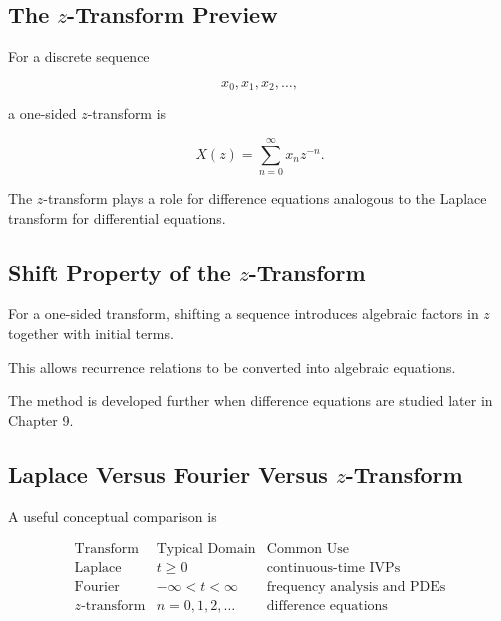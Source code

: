 \subsection{The \(z\)-Transform Preview}
\label{subsec:z-transform-preview}

For a discrete sequence

\[
x_0,x_1,x_2,\ldots,
\]

a one-sided \(z\)-transform is

\[
\boxed{
X(z)
=
\sum_{n=0}^{\infty}
x_nz^{-n}.
}
\]

The \(z\)-transform plays a role for difference equations analogous to
the Laplace transform for differential equations.

\subsection{Shift Property of the \(z\)-Transform}
\label{subsec:z-transform-shift-preview}

For a one-sided transform, shifting a sequence introduces algebraic
factors in \(z\) together with initial terms.

This allows recurrence relations to be converted into algebraic
equations.

The method is developed further when difference equations are studied
later in Chapter 9.

\subsection{Laplace Versus Fourier Versus \(z\)-Transform}
\label{subsec:transform-comparison}

A useful conceptual comparison is

\[
\begin{array}{c|c|c}
\text{Transform}
&
\text{Typical Domain}
&
\text{Common Use}
\\
\hline
\text{Laplace}
&
t\geq0
&
\text{continuous-time IVPs}
\\
\text{Fourier}
&
-\infty<t<\infty
&
\text{frequency analysis and PDEs}
\\
z\text{-transform}
&
n=0,1,2,\ldots
&
\text{difference equations}
\end{array}
\]

